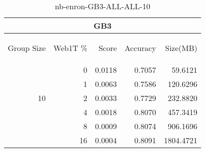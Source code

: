 \begin{center}
\begin{table}[htbp] 
 \begin{center}
\begin{tabular}{ | r | r | r | r | r |}
\hline
\multicolumn{5}{|c|}{GB3}\\
\hline
\begin{sideways}Group Size\end{sideways} & \begin{sideways}Web1T \%\end{sideways} & \begin{sideways}Score\end{sideways} & \begin{sideways}Accuracy\end{sideways} & \begin{sideways}Size(MB)\end{sideways}\\
\hline
\multirow{5}{*}{10}
 & 0 & 0.0118 & 0.7057 & 59.6121\\ \cline{2-5}
 & 1 & 0.0063 & 0.7586 & 120.6296\\ \cline{2-5}
 & 2 & 0.0033 & 0.7729 & 232.8820\\ \cline{2-5}
 & 4 & 0.0018 & 0.8070 & 457.3419\\ \cline{2-5}
 & 8 & 0.0009 & 0.8074 & 906.1696\\ \cline{2-5}
 & 16 & 0.0004 & 0.8091 & 1804.4721\\ \cline{2-5}
\hline
\end{tabular}
\caption{nb-enron-GB3-ALL-ALL-10}
\label{table:nb-enron-GB3-ALL-ALL-10}
\end{center}
 \end{table}
\end{center}

